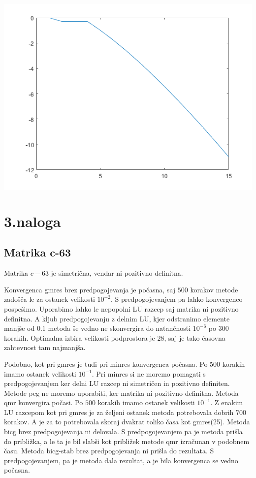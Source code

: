 \documentclass[11pt]{article} %
\begin{document}
\begin{centering}
\includegraphics[scale=0.4]{DL4}
\end{centering}



\section{3.naloga}

\subsection{Matrika c-63}

Matrika $c-63$ je simetrična, vendar ni pozitivno definitna.

Konvergenca gmres brez predpogojevanja je počasna, saj $500$ korakov metode zadošča le za ostanek velikosti $10^{-2}$. S predpogojevanjem pa lahko konvergenco pospešimo. Uporabimo lahko le nepopolni LU razcep saj matrika ni pozitivno definitna. A kljub predpogojevanju z delnim LU, kjer odstranimo elemente manjše od $0.1$ metoda še vedno ne skonvergira do natančnosti $10^{-6}$ po $300$ korakih. Optimalna izbira velikosti podprostora je $28$, saj je tako časovna zahtevnost tam najmanjša.

Podobno, kot pri gmres je tudi pri minres konvergenca počasna. Po $500$ korakih imamo ostanek velikosti $10^{-1}$. Pri minres si ne moremo pomagati s predpogojevanjem ker delni LU razcep ni simetričen in pozitivno definiten.
Metode pcg ne moremo uporabiti, ker matrika ni pozitivno definitna.
Metoda qmr konvergira počasi. Po $500$ korakih imamo ostanek velikosti $10^{-1}$. Z enakim LU razcepom kot pri gmres je za željeni ostanek metoda potrebovala dobrih 700 korakov. A je za to potrebovala skoraj dvakrat toliko časa kot gmres(25).
Metoda bicg brez predpogojevanja ni delovala. S predpogojevanjem pa je metoda prišla do približka, a le ta je bil slabši kot približek metode qmr izračunan v podobnem času.
Metoda bicg-stab brez predpogojevanja ni prišla do rezultata. S predpogojevanjem, pa je metoda dala rezultat, a je bila konvergenca se vedno počasna.
\end{document}
